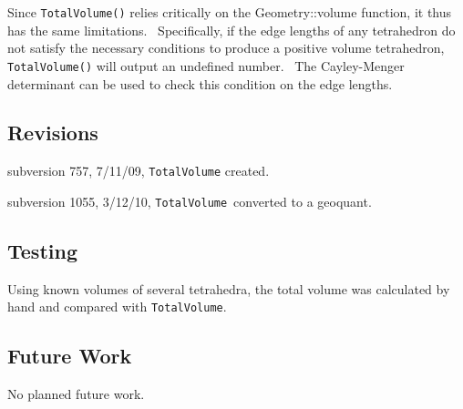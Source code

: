 Since \texttt{TotalVolume()} relies critically on the Geometry::volume
function, it thus has the same limitations. \ Specifically, if the edge
lengths of any tetrahedron do not satisfy the necessary conditions to
produce a positive volume tetrahedron, \texttt{TotalVolume()} will output an
undefined number. \ The Cayley-Menger determinant can be used to check this
condition on the edge lengths.

\subsection*{Revisions}

subversion 757, 7/11/09, \texttt{TotalVolume} created.

subversion 1055, 3/12/10, \texttt{TotalVolume}\ converted to a geoquant.

\subsection*{Testing}

Using known volumes of several tetrahedra, the total volume was calculated
by hand and compared with \texttt{TotalVolume}.

\subsection*{Future Work}

No planned future work.
